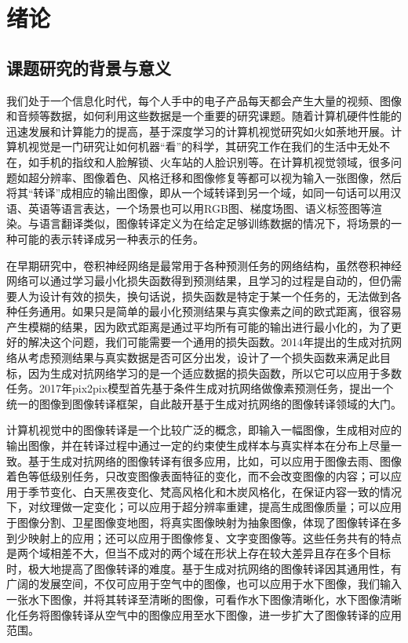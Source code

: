 \chapter{绪论}

\section{课题研究的背景与意义}
我们处于一个信息化时代，每个人手中的电子产品每天都会产生大量的视频、图像和音频等数据，如何利用这些数据是一个重要的研究课题。随着计算机硬件性能的迅速发展和计算能力的提高，基于深度学习的计算机视觉研究如火如荼地开展。计算机视觉是一门研究让如何机器“看”的科学，其研究工作在我们的生活中无处不在，如手机的指纹和人脸解锁、火车站的人脸识别等。在计算机视觉领域，很多问题如超分辨率、图像着色、风格迁移和图像修复等都可以视为输入一张图像，然后将其“转译”成相应的输出图像，即从一个域转译到另一个域，如同一句话可以用汉语、英语等语言表达，一个场景也可以用RGB图、梯度场图、语义标签图等渲染。与语言翻译类似，图像转译定义为在给定足够训练数据的情况下，将场景的一种可能的表示转译成另一种表示的任务。

在早期研究中，卷积神经网络是最常用于各种预测任务的网络结构，虽然卷积神经网络可以通过学习最小化损失函数得到预测结果，且学习的过程是自动的，但仍需要人为设计有效的损失，换句话说，损失函数是特定于某一个任务的，无法做到各种任务通用。如果只是简单的最小化预测结果与真实像素之间的欧式距离，很容易产生模糊的结果，因为欧式距离是通过平均所有可能的输出进行最小化的，为了更好的解决这个问题，我们可能需要一个通用的损失函数。2014年提出的生成对抗网络\cite{goodfellow2014generative}从考虑预测结果与真实数据是否可区分出发，设计了一个损失函数来满足此目标，因为生成对抗网络学习的是一个适应数据的损失函数，所以它可以应用于多数任务。2017年pix2pix\cite{isola2017image}模型首先基于条件生成对抗网络做像素预测任务，提出一个统一的图像到图像转译框架，自此敲开基于生成对抗网络的图像转译领域的大门。

计算机视觉中的图像转译是一个比较广泛的概念，即输入一幅图像，生成相对应的输出图像，并在转译过程中通过一定的约束使生成样本与真实样本在分布上尽量一致。基于生成对抗网络的图像转译有很多应用，比如，可以应用于图像去雨、图像着色等低级别任务，只改变图像表面特征的变化，而不会改变图像的内容；可以应用于季节变化、白天黑夜变化、梵高风格化和木炭风格化，在保证内容一致的情况下，对纹理做一定变化；可以应用于超分辨率重建，提高生成图像质量；可以应用于图像分割、卫星图像变地图，将真实图像映射为抽象图像，体现了图像转译在多到少映射上的应用；还可以应用于图像修复、文字变图像等。这些任务共有的特点是两个域相差不大，但当不成对的两个域在形状上存在较大差异且存在多个目标时，极大地提高了图像转译的难度。基于生成对抗网络的图像转译因其通用性，有广阔的发展空间，不仅可应用于空气中的图像，也可以应用于水下图像，我们输入一张水下图像，并将其转译至清晰的图像，可看作水下图像清晰化，水下图像清晰化任务将图像转译从空气中的图像应用至水下图像，进一步扩大了图像转译的应用范围。

